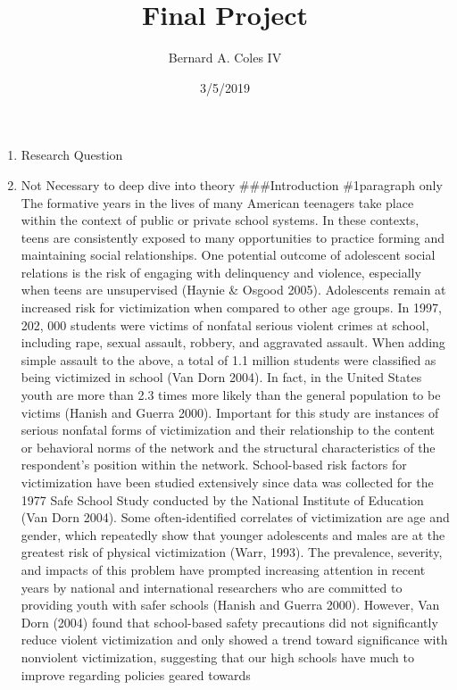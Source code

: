 \documentclass[]{article}
\title{Final Project}
\author{Bernard A. Coles IV}
\date{3/5/2019}
\providecommand{\tightlist}{%
  \setlength{\itemsep}{0pt}\setlength{\parskip}{0pt}}
\begin{document}
\maketitle

\begin{enumerate}
\def\labelenumi{(\arabic{enumi})}
\tightlist
\item
  Research Question
\item
  Not Necessary to deep dive into theory \#\#\#Introduction \#1paragraph
  only The formative years in the lives of many American teenagers take
  place within the context of public or private school systems. In these
  contexts, teens are consistently exposed to many opportunities to
  practice forming and maintaining social relationships. One potential
  outcome of adolescent social relations is the risk of engaging with
  delinquency and violence, especially when teens are unsupervised
  (Haynie \& Osgood 2005). Adolescents remain at increased risk for
  victimization when compared to other age groups. In 1997, 202, 000
  students were victims of nonfatal serious violent crimes at school,
  including rape, sexual assault, robbery, and aggravated assault. When
  adding simple assault to the above, a total of 1.1 million students
  were classified as being victimized in school (Van Dorn 2004). In
  fact, in the United States youth are more than 2.3 times more likely
  than the general population to be victims (Hanish and Guerra 2000).
  Important for this study are instances of serious nonfatal forms of
  victimization and their relationship to the content or behavioral
  norms of the network and the structural characteristics of the
  respondent's position within the network. School-based risk factors
  for victimization have been studied extensively since data was
  collected for the 1977 Safe School Study conducted by the National
  Institute of Education (Van Dorn 2004). Some often-identified
  correlates of victimization are age and gender, which repeatedly show
  that younger adolescents and males are at the greatest risk of
  physical victimization (Warr, 1993). The prevalence, severity, and
  impacts of this problem have prompted increasing attention in recent
  years by national and international researchers who are committed to
  providing youth with safer schools (Hanish and Guerra 2000). However,
  Van Dorn (2004) found that school-based safety precautions did not
  significantly reduce violent victimization and only showed a trend
  toward significance with nonviolent victimization, suggesting that our
  high schools have much to improve regarding policies geared towards

\end{enumerate}
\end{document}
